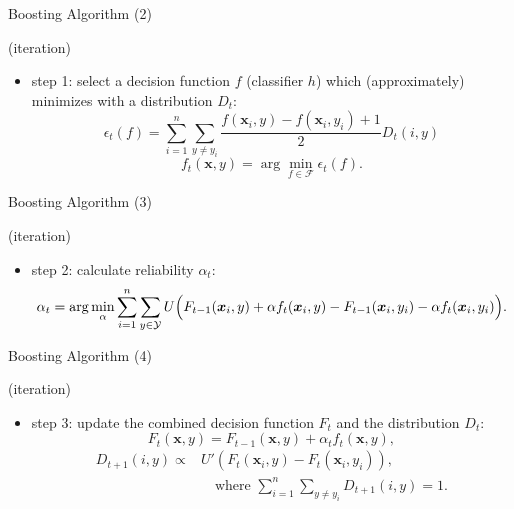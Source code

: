 \documentclass[fleqn,aspectratio=1610]{beamer}
\begin{document}
\begin{frame}[label={sec:org2e234fb}]{Boosting Algorithm (2)}
\begin{block}{(iteration)}
\begin{itemize}
\item \alert{step 1:}
select a decision function \(f\) (classifier \(h\)) 
which (approximately) minimizes 
with a distribution \(D_t\):
\begin{equation}
  \epsilon_t(f) 
  =\sum_{i=1}^{n}\sum_{y\not=y_i}
  \frac{f(\boldsymbol{x}_i,y)-f(\boldsymbol{x}_i,y_i)+1}{2} D_t(i,y)
\end{equation}
\begin{equation}
  f_t(\boldsymbol{x},y)
  =\arg\min_{f\in\mathcal{F}}\epsilon_t(f).
\end{equation}
\end{itemize}
\end{block}
\end{frame}
\begin{frame}[label={sec:orgcc2f7c1}]{Boosting Algorithm (3)}
\begin{block}{(iteration)}
\begin{itemize}
\item \alert{step 2:}
calculate reliability \(\alpha_t\):
\begin{equation}
  \alpha_t 
  =\arg\min_{\alpha}\sum_{i=1}^n\sum_{y\in\mathcal{Y}}
  U\Bigl(F_{t-1}(\boldsymbol{x}_i,y)
  +\alpha f_{t}(\boldsymbol{x}_i,y)
  -F_{t-1}(\boldsymbol{x}_i,y_i)
  -\alpha f_{t}(\boldsymbol{x}_i,y_i)\Bigr).
\end{equation}
\end{itemize}
\end{block}
\end{frame}
\begin{frame}[label={sec:org457c6fa}]{Boosting Algorithm (4)}
\begin{block}{(iteration)}
\begin{itemize}
\item \alert{step 3:}
update the combined decision function \(F_t\) and the distribution \(D_t\):
\begin{equation}
  F_{t}(\boldsymbol{x},y)
  =F_{t-1}(\boldsymbol{x},y)+\alpha_{t}f_{t}(\boldsymbol{x},y),
\end{equation}
\begin{align}
  D_{t+1}(i,y)\propto
  & U'\left(F_{t}(\boldsymbol{x}_i,y)
    -F_{t}(\boldsymbol{x}_i,y_i)\right),\\
  &\quad\text{where }
    \sum_{i=1}^n\sum_{y\not=y_i}D_{t+1}(i,y)=1.
\end{align}
\end{itemize}
\end{block}
\end{frame}
\end{document}
